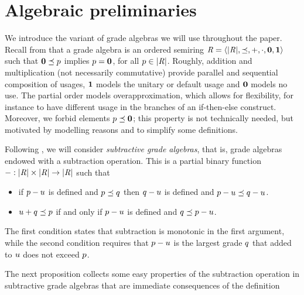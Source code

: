 
\section{Algebraic preliminaries}
We introduce the variant of grade algebras we will use throughout the paper. 
Recall from \cite{BianchiniDGZ23ecoop,BianchiniDGZ23oopsla} that a grade algebra is an ordered semiring 
$\mathit{R} = \langle |\mathit{R}|,\preceq,+,{\cdot},\mathbf{0},\mathbf{1} \rangle$ such that $\mathbf{0}\preceq p$ implies $p = \mathbf{0}$, for all $p\in|\mathit{R}|$. 
Roughly,  addition and multiplication (not necessarily commutative) provide parallel and sequential composition of usages, 
$\mathbf{1}$ models the unitary or default usage and 
$\mathbf{0}$ models  no use. The partial order models overapproximation, which allows for flexibility, for instance to have  different usage in the branches of an if-then-else construct. 
Moreover, we forbid elements $p\preceq\mathbf{0}$; this property is not technically needed, but motivated by modelling reasons and to simplify some definitions. 

Following \cite{DagninoGKT25}, we will consider \emph{subtractive grade algebras}, that is, grade algebras endowed with a subtraction operation. 
This is a partial binary function $- : |\mathit{R}|\times|\mathit{R}| \to |\mathit{R}|$ such that
\begin{itemize}
\item if $p- u$ is defined and $p \preceq q$ then $q-  u$ is defined and $p- u \preceq q- u$.
\item $u + q \preceq p$ if and only if $p- u$ is defined and $q\preceq p - u$.
\end{itemize}
The first condition states that subtraction is monotonic in the first argument, while the second condition 
requires that $p-u$ is the largest grade $q$ that added to $u$ does not exceed $p$.  

The next proposition collects some easy properties of the subtraction operation in subtractive grade algebras that are immediate consequences of the definition

